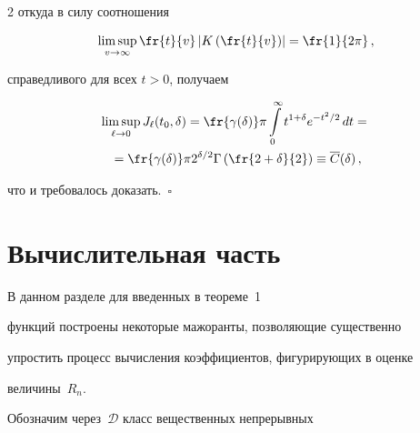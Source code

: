\begin{multicols}{2}
откуда в силу соотношения


\columnbreak





\noindent


$$


\limsup_{v\to\infty}


\fr{t}{v}\left|K\left(\fr{t}{v}\right)\right|=\fr{1}{2\pi}\,,


$$


справедливого для всех $t>0$, получаем


\begin{multline*}


\limsup_{\ell\to0}J_\ell(t_0,\delta)= \fr{\gamma(\delta)}\pi


\int\limits_0^{\infty}t^{1+\delta}e^{-{t^2}/2}\,dt={}\\


{}=


\fr{\gamma(\delta)}\pi 2^{\delta/2}\Gamma\left(\fr{2+\delta}{2}\right)\equiv


\overline{C}(\delta)\,,


\end{multline*}


что и требовалось доказать.~$\square$















\section{Вычислительная часть}





В данном разделе для введенных в теореме~1


функций построены некоторые мажоранты, позволяющие существенно


упростить процесс вычисления коэффициентов, фигурирующих в оценке


величины~$R_n$.





Обозначим через~$\mathcal D$ класс вещественных непрерывных



\end{multicols}
